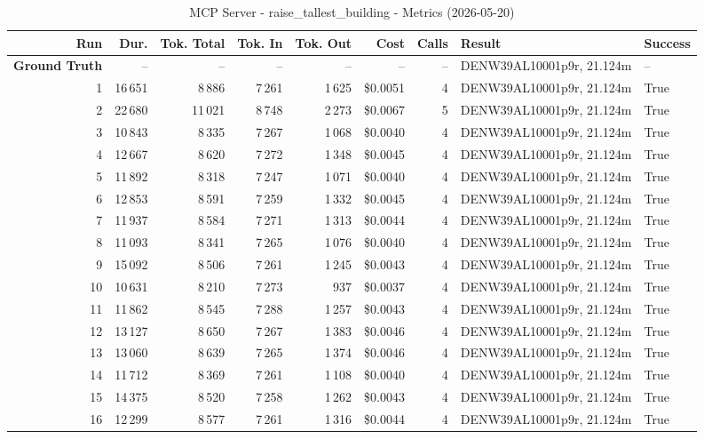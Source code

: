 \documentclass[a4paper,11pt]{article}
\begin{document}
\begin{table}[ht]
\centering
\scriptsize
\caption{MCP Server - raise\_tallest\_building - Metrics (2026-05-20)}
\label{tab:mcp\_raise\_tallest\_building\_metrics\_2026-05-20}
\begin{tabular}{r r r r r r r p{3cm} l}
\hline
Run & Dur. & Tok. Total & Tok. In & Tok. Out & Cost & Calls & Result & Success \\
\hline
\textbf{Ground Truth} & -- & -- & -- & -- & -- & -- & DENW39AL10001p9r, 21.124m & -- \\
\hline
1 & 16\,651 & 8\,886 & 7\,261 & 1\,625 & \$0.0051 & 4 & DENW39AL10001p9r, 21.124m & True \\
2 & 22\,680 & 11\,021 & 8\,748 & 2\,273 & \$0.0067 & 5 & DENW39AL10001p9r, 21.124m & True \\
3 & 10\,843 & 8\,335 & 7\,267 & 1\,068 & \$0.0040 & 4 & DENW39AL10001p9r, 21.124m & True \\
4 & 12\,667 & 8\,620 & 7\,272 & 1\,348 & \$0.0045 & 4 & DENW39AL10001p9r, 21.124m & True \\
5 & 11\,892 & 8\,318 & 7\,247 & 1\,071 & \$0.0040 & 4 & DENW39AL10001p9r, 21.124m & True \\
6 & 12\,853 & 8\,591 & 7\,259 & 1\,332 & \$0.0045 & 4 & DENW39AL10001p9r, 21.124m & True \\
7 & 11\,937 & 8\,584 & 7\,271 & 1\,313 & \$0.0044 & 4 & DENW39AL10001p9r, 21.124m & True \\
8 & 11\,093 & 8\,341 & 7\,265 & 1\,076 & \$0.0040 & 4 & DENW39AL10001p9r, 21.124m & True \\
9 & 15\,092 & 8\,506 & 7\,261 & 1\,245 & \$0.0043 & 4 & DENW39AL10001p9r, 21.124m & True \\
10 & 10\,631 & 8\,210 & 7\,273 & 937 & \$0.0037 & 4 & DENW39AL10001p9r, 21.124m & True \\
11 & 11\,862 & 8\,545 & 7\,288 & 1\,257 & \$0.0043 & 4 & DENW39AL10001p9r, 21.124m & True \\
12 & 13\,127 & 8\,650 & 7\,267 & 1\,383 & \$0.0046 & 4 & DENW39AL10001p9r, 21.124m & True \\
13 & 13\,060 & 8\,639 & 7\,265 & 1\,374 & \$0.0046 & 4 & DENW39AL10001p9r, 21.124m & True \\
14 & 11\,712 & 8\,369 & 7\,261 & 1\,108 & \$0.0040 & 4 & DENW39AL10001p9r, 21.124m & True \\
15 & 14\,375 & 8\,520 & 7\,258 & 1\,262 & \$0.0043 & 4 & DENW39AL10001p9r, 21.124m & True \\
16 & 12\,299 & 8\,577 & 7\,261 & 1\,316 & \$0.0044 & 4 & DENW39AL10001p9r, 21.124m & True \\

\end{tabular}
\end{table}
\end{document}
